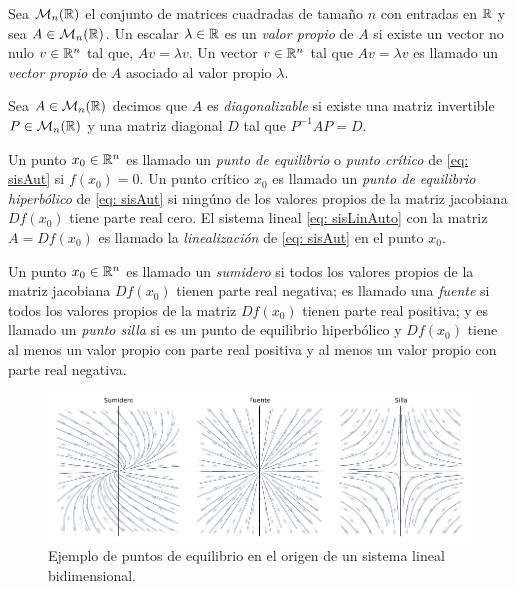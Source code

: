     Sea $\mathcal{M}_{n}({\mathbb{R}})$ el conjunto de matrices cuadradas de tamaño $n$ con entradas en ${\mathbb{R}}$ y sea $A \in \mathcal{M}_{n}({\mathbb{R}})$. Un escalar $\lambda \in {\mathbb{R}}$ es un \textit{valor propio} de $A$ si existe un vector no nulo $v \in {\mathbb{R}}^{n}$ tal que, $Av = \lambda v$. Un vector $v \in {\mathbb{R}}^{n}$ tal que $Av = \lambda v$ es llamado un \textit{vector propio} de $A$ asociado al valor propio $\lambda$.
   
    Sea $A \in \mathcal{M}_{n}({\mathbb{R}})$ decimos que $A$ es \textit{diagonalizable} si existe una matriz invertible $P \in \mathcal{M}_{n}({\mathbb{R}})$ y una matriz diagonal $D$ tal que $P^{-1}AP = D$.
   
    Un punto $x_{0} \in {\mathbb{R}}^{n}$ es llamado un \textit{punto de equilibrio} o \textit{punto crítico} de \eqref{eq: sisAut} si $f(x_{0})=0$. Un punto crítico $x_{0}$ es llamado un \textit{punto de equilibrio hiperbólico} de \eqref{eq: sisAut} si ningúno de los valores propios de la matriz jacobiana $Df(x_{0})$ tiene parte real cero. El sistema lineal \eqref{eq: sisLinAuto} con la matriz $A = Df(x_{0})$ es llamado la \textit{linealización} de \eqref{eq: sisAut} en el punto $x_{0}$.
   
    Un punto $x_{0} \in {\mathbb{R}}^{n}$ es llamado un \textit{sumidero} si todos los valores propios de la matriz jacobiana $Df(x_{0})$ tienen parte real negativa; es llamado una \textit{fuente} si todos los valores propios de la matriz $Df(x_{0})$ tienen parte real positiva; y es llamado un \textit{punto silla} si es un punto de equilibrio hiperbólico y $Df(x_{0})$ tiene al menos un valor propio con parte real positiva y al menos un valor propio con parte real negativa.
   
   \begin{figure}
     \centering
     \includegraphics[width=1\textwidth]{img/EquilibriumPoints.pdf}
     \caption{Ejemplo de puntos de equilibrio en el origen de un sistema lineal bidimensional.}
     \label{fig: EquilibriumPoints}
   \end{figure}
